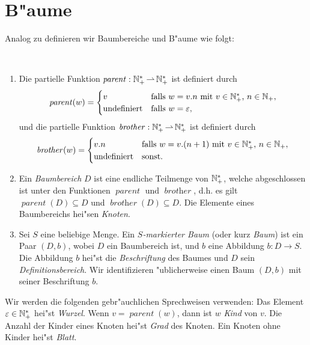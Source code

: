 \documentclass[12pt,a4paper,final]{article}
\DeclareMathOperator{\brother}{\mathit{brother}}
\DeclareMathOperator{\parent}{\mathit{parent}}
\begin{document}

\section{B"aume}
\label{sec:Baeume}

Analog zu
\cite{DBLP:journals/jacm/Rosen73,DBLP:journals/jacm/GoguenTWW77,DBLP:journals/tcs/Courcelle83,DBLP:books/teu/LoeckxMW86}
definieren wir Baumbereiche und B"aume wie folgt:

\begin{definition} \
  \begin{enumerate}
  \item Die partielle Funktion \mbox{$\parent:\N_+^* \pto \N_+^*$} ist definiert durch
    \begin{equation*}
      \parent(w) = 
      \begin{cases}
        v
        & \text{falls $w = v.n$ mit $v \in \N_+^*$, $n \in \N_+$}, \\
        \text{undefiniert}
        & \text{falls $w = \varepsilon$},
      \end{cases}
    \end{equation*}
    und die partielle Funktion \mbox{$\brother:\N_+^* \pto \N_+^*$} ist definiert durch
    \begin{equation*}
      \brother(w) =
      \begin{cases}
        v.n
        & \text{falls $w = v.(n+1)$ mit $v \in \N_+^*$, $n \in \N_+$}, \\
        \text{undefiniert}
        & \text{sonst}.
      \end{cases}
    \end{equation*}

  \item Ein \emph{Baumbereich} $D$ ist eine endliche Teilmenge von $\mathbb N_+^*$, welche
    abgeschlossen ist unter den Funktionen $\parent$ und $\brother$, d.h.\xspace es gilt
    \mbox{$\parent(D) \subseteq D$} und \mbox{$\brother(D) \subseteq D$}.
    Die Elemente eines Baumbereichs hei"sen \emph{Knoten}.

  \item Sei $S$ eine beliebige Menge. Ein \emph{$S$-markierter Baum} (oder kurz \emph{Baum})
    ist ein Paar \mbox{$(D,b)$}, wobei $D$ ein Baumbereich ist, und $b$ eine Abbildung
    \mbox{$b:D \to S$}. Die Abbildung $b$ hei"st die \emph{Beschriftung} des
    Baumes und $D$ sein \emph{Definitionsbereich}.
    Wir identifizieren "ublicherweise einen Baum $(D,b)$ mit seiner Beschriftung $b$.
  \end{enumerate}
\end{definition}
Wir werden die folgenden gebr"auchlichen Sprechweisen verwenden: Das Element
\mbox{$\varepsilon \in \mathbb N_+^*$} hei"st \emph{Wurzel}. Wenn $v = \parent(w)$, dann
ist $w$ \emph{Kind} von $v$. Die Anzahl der Kinder eines Knoten hei"st
\emph{Grad} des Knoten. Ein Knoten ohne Kinder hei"st \emph{Blatt}.
\end{document}
